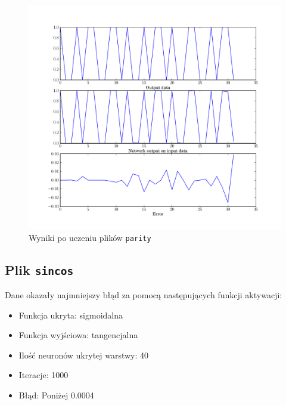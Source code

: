 \documentclass[pointlessnumbers, abstracton, headsepline, a4paper]{scrartcl}
\begin{document}
\clearpage
\begin{figure}[!h]
\centering
\includegraphics[scale=0.7]{src/parity.pdf}\caption{\label{fig:parity_result}Wyniki po uczeniu plików \texttt{parity}}
\end{figure}

\clearpage
\subsection{Plik \texttt{sincos}}

Dane okazały najmniejszy błąd za pomocą następujących funkcji aktywacji:
\begin{itemize}
\item Funkcja ukryta: sigmoidalna
\item Funkcja wyjściowa: tangencjalna
\item Ilość neuronów ukrytej warstwy: 40
\item Iteracje: 1000
\item Błąd: Poniżej 0.0004
\end{itemize}
\end{document}
